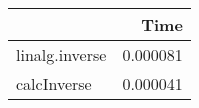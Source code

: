 \begin{tabular}{lr}
\toprule
{} &      Time \\
\midrule
linalg.inverse &  0.000081 \\
calcInverse    &  0.000041 \\
\bottomrule
\end{tabular}
